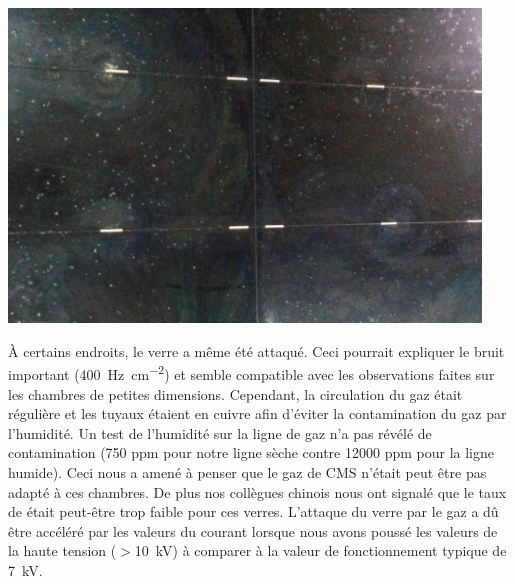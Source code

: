 \begin{minipage}[th!]{1\textwidth}
\begin{minipage}[th!]{0.48\textwidth}
\begin{minipage}[th!]{1\textwidth}
		\label{depot2}
	\end{minipage}%
		\\
			\begin{minipage}[th!]{1\textwidth}
			\noindent
			\centering
			\includegraphics[width=0.94\textwidth]{GLA/perle.jpg}
			\label{perle}
		\end{minipage}%
	\end{minipage}%
	\addtocounter{figure}{-1}
	\label{probs}
\end{minipage}%

 À certains endroits, le verre a même été attaqué. Ceci pourrait expliquer le bruit important (\SI{400}{\hertz\per\square\centi\meter}) et semble compatible avec les observations faites sur les chambres de petites dimensions. Cependant, la circulation du gaz était régulière et les tuyaux étaient en cuivre afin d'éviter la contamination du gaz par l'humidité. Un test de l'humidité sur la ligne de gaz n'a pas révélé de contamination (\num{750} ppm pour notre ligne sèche contre \num{12000} ppm pour la ligne humide). Ceci nous a amené à penser que le gaz de CMS n'était peut être pas adapté à ces chambres. De plus nos collègues chinois nous ont signalé que le taux de  était peut-être trop faible pour ces verres. L'attaque du verre par le gaz a dû être accéléré par les valeurs du courant lorsque nous avons poussé les valeurs de la haute tension ($>$\SI{10}{\kilo\volt}) à comparer à la valeur de fonctionnement typique de \SI{7}{\kilo\volt}.
 
